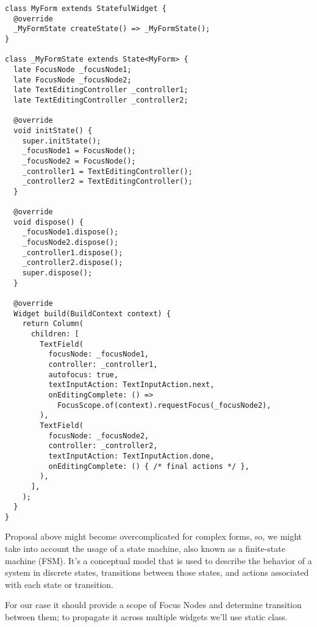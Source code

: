 \begin{lstlisting}
class MyForm extends StatefulWidget {
  @override
  _MyFormState createState() => _MyFormState();
}

class _MyFormState extends State<MyForm> {
  late FocusNode _focusNode1;
  late FocusNode _focusNode2;
  late TextEditingController _controller1;
  late TextEditingController _controller2;

  @override
  void initState() {
    super.initState();
    _focusNode1 = FocusNode();
    _focusNode2 = FocusNode();
    _controller1 = TextEditingController();
    _controller2 = TextEditingController();
  }

  @override
  void dispose() {
    _focusNode1.dispose();
    _focusNode2.dispose();
    _controller1.dispose();
    _controller2.dispose();
    super.dispose();
  }

  @override
  Widget build(BuildContext context) {
    return Column(
      children: [
        TextField(
          focusNode: _focusNode1,
          controller: _controller1,
          autofocus: true,
          textInputAction: TextInputAction.next,
          onEditingComplete: () =>
            FocusScope.of(context).requestFocus(_focusNode2),
        ),
        TextField(
          focusNode: _focusNode2,
          controller: _controller2,
          textInputAction: TextInputAction.done,
          onEditingComplete: () { /* final actions */ },
        ),
      ],
    );
  }
}
\end{lstlisting}

Proposal above might become overcomplicated for complex forms, so, we might take into account the usage of a state 
machine, also known as a finite-state machine (FSM). It's a conceptual model that is used to describe the behavior of a 
system in discrete states, transitions between those states, and actions associated with each state or transition.

For our case it should provide a scope of Focus Nodes and determine transition between them; to propagate it across
multiple widgets we'll use static class.

